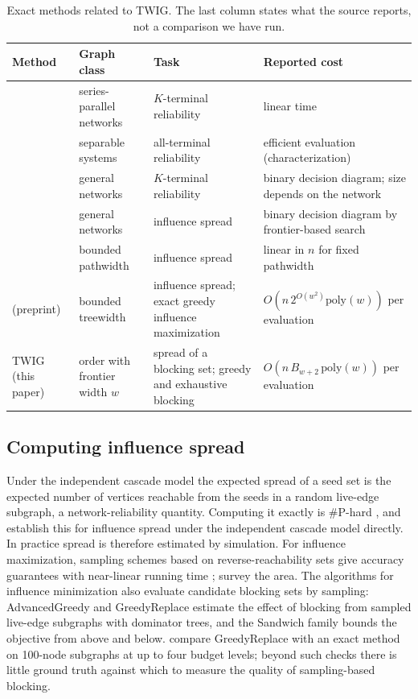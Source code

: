 \documentclass[11pt]{article}
\theoremstyle{definition}
\theoremstyle{remark}
\newcommand{\up}{\rule{0pt}{2.6ex}}
\begin{document}
\begin{table}[h]
\centering
\caption{Exact methods related to TWIG. The last column states what the source reports, not a comparison we have run.}\label{tab:related-exact}
\small
\begin{tabular}{@{}>{\raggedright\arraybackslash}p{}>{\raggedright\arraybackslash}p{}>{\raggedright\arraybackslash}p{}>{\raggedright\arraybackslash}p{}@{}}
\hline
\up Method & Graph class & Task & Reported cost \\
\hline
\up \citet{satyanarayana1985} & series-parallel networks & $K$-terminal reliability & linear time \\
\citet{cancela2021} & separable systems & all-terminal reliability & efficient evaluation (characterization) \\
\citet{hardy2007} & general networks & $K$-terminal reliability & binary decision diagram; size depends on the network \\
\citet{maehara2017} & general networks & influence spread & binary decision diagram by frontier-based search \\
\citet{nakamura2026} & bounded pathwidth & influence spread & linear in $n$ for fixed pathwidth \\
\citet{pozar2026} (preprint) & bounded treewidth & influence spread; exact greedy influence maximization & $O(n\,2^{O(w^2)}\mathrm{poly}(w))$ per evaluation \\
TWIG (this paper) & order with frontier width $w$ & spread of a blocking set; greedy and exhaustive blocking & $O(n\,B_{w+2}\,\mathrm{poly}(w))$ per evaluation \\
\hline
\end{tabular}
\end{table}

\subsection{Computing influence spread}

Under the independent cascade model the expected spread of a seed set is the expected number of vertices reachable from the seeds in a random live-edge subgraph, a network-reliability quantity. Computing it exactly is \#P-hard \citep{valiant1979,provan1983}, and \citet{chen2010} establish this for influence spread under the independent cascade model directly. In practice spread is therefore estimated by simulation. For influence maximization, sampling schemes based on reverse-reachability sets give accuracy guarantees with near-linear running time \citep{borgs2014,tang2014}; \citet{li2018} survey the area. The algorithms for influence minimization also evaluate candidate blocking sets by sampling: AdvancedGreedy and GreedyReplace \citep{xie2023,xie2024} estimate the effect of blocking from sampled live-edge subgraphs with dominator trees, and the Sandwich family \citep{wang2024sandwich} bounds the objective from above and below. \citet{xie2024} compare GreedyReplace with an exact method on 100-node subgraphs at up to four budget levels; beyond such checks there is little ground truth against which to measure the quality of sampling-based blocking.
\end{document}
